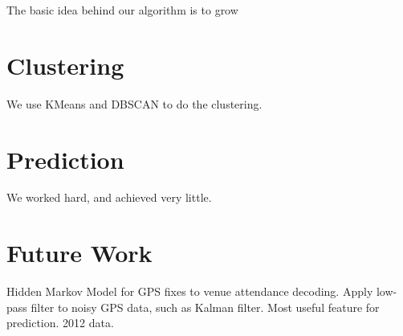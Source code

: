 \documentclass[12pt]{article}
\begin{document}
The basic idea behind our algorithm is to grow 

\section{Clustering}\label{clustering}
We use KMeans and DBSCAN \cite{Ester96} to do the clustering.

\section{Prediction}\label{prediction}
We worked hard, and achieved very little.

\section{Future Work}\label{future_work}
Hidden Markov Model for GPS fixes to venue attendance decoding. Apply low-pass filter to noisy GPS data, such as Kalman filter. Most useful feature for prediction. 2012 data. 



\end{document}
